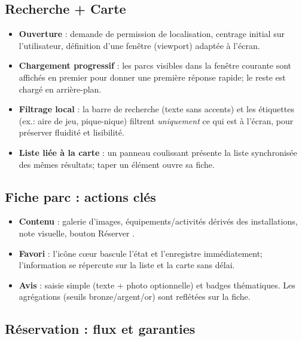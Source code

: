 \documentclass[12pt,a4paper]{article}
\begin{document}
\subsection{Recherche + Carte }

\begin{itemize}
  \item \textbf{Ouverture} : demande de permission de localisation, centrage initial sur l’utilisateur, définition d’une fenêtre (viewport) adaptée à l’écran.
  \item \textbf{Chargement progressif} : les parcs visibles dans la fenêtre courante sont affichés en premier pour donner une première réponse rapide; le reste est chargé en arrière-plan.
  \item \textbf{Filtrage local} : la barre de recherche (texte sans accents) et les étiquettes (ex.: aire de jeu, pique-nique) filtrent \emph{uniquement} ce qui est à l’écran, pour préserver fluidité et lisibilité.
  \item \textbf{Liste liée à la carte} : un panneau coulissant présente la liste synchronisée des mêmes résultats; taper un élément ouvre sa fiche.
\end{itemize}

\subsection{Fiche parc : actions clés}

\begin{itemize}
  \item \textbf{Contenu} : galerie d’images, équipements/activités dérivés des installations, note visuelle, bouton \og Réserver \fg.
  \item \textbf{Favori} : l’icône cœur bascule l’état et l’enregistre immédiatement; l’information se répercute sur la liste et la carte sans délai.
  \item \textbf{Avis} : saisie simple (texte + photo optionnelle) et badges thématiques. Les agrégations (seuils bronze/argent/or) sont reflétées sur la fiche.
\end{itemize}

\subsection{Réservation : flux et garanties}
\end{document}
